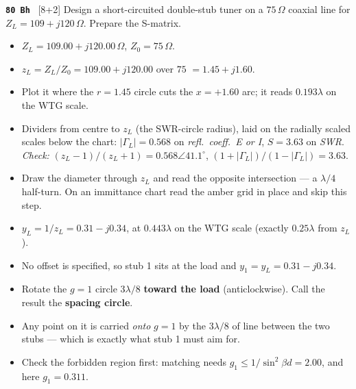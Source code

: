 \begin{asked}{\textbf{\texttt{80 Bh}} \ [8+2]}
Design a short-circuited double-stub tuner on a $75\,\Omega$ coaxial line for $Z_L = 109+j120\,\Omega$. Prepare the S-matrix.
\end{asked}
\begin{itemize}
  \item $Z_L = 109.00 + j120.00\,\Omega$, $Z_0 = 75\,\Omega$.
\end{itemize}
\begin{itemize}
  \item $z_L = Z_L/Z_0 = 109.00 + j120.00$ over $75$ $=1.45 + j1.60$.
  \item Plot it where the $r = 1.45$ circle cuts the $x = +1.60$ arc; it reads $0.193\lambda$ on the WTG scale.
  \item Dividers from centre to $z_L$ (the SWR-circle radius), laid on the radially scaled scales below the chart: $|\Gamma_L| = 0.568$ on \emph{refl.\ coeff.\ E or I}, $S = 3.63$ on \emph{SWR}. \textit{Check:} $(z_L-1)/(z_L+1) = 0.568\angle 41.1^\circ$, $(1+|\Gamma_L|)/(1-|\Gamma_L|) = 3.63$.
\end{itemize}
\begin{itemize}
  \item Draw the diameter through $z_L$ and read the opposite intersection --- a $\lambda/4$ half-turn. On an immittance chart read the amber grid in place and skip this step.
  \item $y_L = 1/z_L = 0.31 - j0.34$, at $0.443\lambda$ on the WTG scale (exactly $0.25\lambda$ from $z_L$).
\end{itemize}
\begin{itemize}
  \item No offset is specified, so stub 1 sits at the load and $y_1 = y_L = 0.31 - j0.34$.
\end{itemize}
\begin{itemize}
  \item Rotate the $g=1$ circle $3\lambda/8$ \textbf{toward the load} (anticlockwise). Call the result the \textbf{spacing circle}.
  \item Any point on it is carried \emph{onto} $g=1$ by the $3\lambda/8$ of line between the two stubs --- which is exactly what stub 1 must aim for.
  \item Check the forbidden region first: matching needs $g_1 \le 1/\sin^2\beta d = 2.00$, and here $g_1 = 0.311$. \checkmark
\end{itemize}
